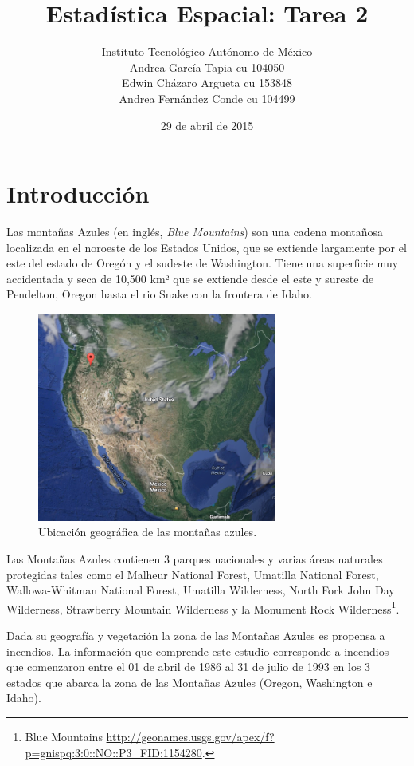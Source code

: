 \documentclass[12,]{article}
\title{Estadística Espacial: Tarea 2}
\author{Instituto Tecnológico Autónomo de México \\ Andrea García Tapia cu 104050 \\ Edwin Cházaro Argueta cu 153848 \\ Andrea Fernández Conde cu 104499}
\date{29 de abril de 2015}
\let\rmarkdownfootnote\footnote%
\def\footnote{\protect\rmarkdownfootnote}
\begin{document}
\maketitle


{
\hypersetup{linkcolor=black}
\setcounter{tocdepth}{2}
\tableofcontents
}
\pagebreak

\section{Introducción}\label{introduccion}

Las montañas Azules (en inglés, \emph{Blue Mountains}) son una cadena
montañosa localizada en el noroeste de los Estados Unidos, que se
extiende largamente por el este del estado de Oregón y el sudeste de
Washington. Tiene una superficie muy accidentada y seca de 10,500 km²
que se extiende desde el este y sureste de Pendelton, Oregon hasta el
rio Snake con la frontera de Idaho.

\begin{figure}[H]
\centering
\includegraphics[width=0.7\textwidth]{imagenes/usa.png}
\caption{Ubicación geográfica de las montañas azules.}

\end{figure}

Las Montañas Azules contienen 3 parques nacionales y varias áreas
naturales protegidas tales como el Malheur National Forest, Umatilla
National Forest, Wallowa-Whitman National Forest, Umatilla Wilderness,
North Fork John Day Wilderness, Strawberry Mountain Wilderness y la
Monument Rock Wilderness\footnote{Blue Mountains
  \url{http://geonames.usgs.gov/apex/f?p=gnispq:3:0::NO::P3_FID:1154280}.}.

Dada su geografía y vegetación la zona de las Montañas Azules es
propensa a incendios. La información que comprende este estudio
corresponde a incendios que comenzaron entre el 01 de abril de 1986 al
31 de julio de 1993 en los 3 estados que abarca la zona de las Montañas
Azules (Oregon, Washington e Idaho).
\end{document}
